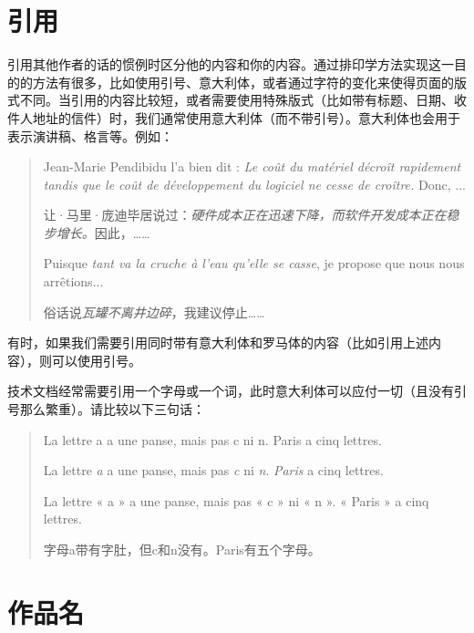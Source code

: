 \section{引用}

引用其他作者的话的惯例时区分他的内容和你的内容。通过排印学方法实现这一目的的方法有很多，比如使用引号、意大利体，或者通过字符的变化来使得页面的版式不同。当引用的内容比较短，或者需要使用特殊版式（比如带有标题、日期、收件人地址的信件）时，我们通常使用意大利体（而不带引号）。意大利体也会用于表示演讲稿、格言等。例如：

\begin{quote}
    Jean-Marie Pendibidu l'a bien dit : \emph{Le coût du matériel décroît rapidement tandis que le coût de développement du logiciel ne cesse de croître.} Donc, ...

    \begin{bil}
        让·马里·庞迪毕居说过：\emph{硬件成本正在迅速下降，而软件开发成本正在稳步增长。}因此，……
    \end{bil}
    
    Puisque \emph{tant va la cruche à l'eau qu'elle se casse}, je propose que nous nous arrêtions...

    \begin{bil}
        俗话说\emph{瓦罐不离井边碎}，我建议停止……
    \end{bil}

\end{quote}

有时，如果我们需要引用同时带有意大利体和罗马体的内容（比如引用上述内容），则可以使用引号。

技术文档经常需要引用一个字母或一个词，此时意大利体可以应付一切（且没有引号那么繁重）。请比较以下三句话：

\begin{quote}
    La lettre a a une panse, mais pas c ni n. Paris a cinq lettres.

    La lettre \emph{a} a une panse, mais pas \emph{c} ni \emph{n}. \emph{Paris} a cinq lettres.

    La lettre « a » a une panse, mais pas « c » ni « n ». « Paris » a cinq lettres.

    \begin{bil}
        字母a带有字肚，但c和n没有。Paris有五个字母。
    \end{bil}
\end{quote}

\section{作品名}

